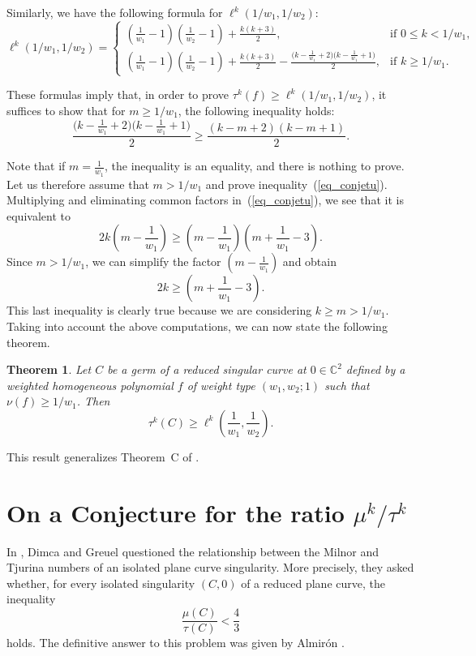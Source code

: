 \documentclass[12pt,letterpaper]{amsart}
\newcommand{\C}{\mathbb{C}}
\newtheorem{theorem}{Theorem}[section]
\begin{document}
Similarly, we have the following formula for $\ell^{k}(1/w_1,1/w_2)$:
\[
\ell^{k}(1/w_1,1/w_2)=
\begin{cases}
\left(\frac{1}{w_1}-1\right)\left(\frac{1}{w_2}-1\right)+\frac{k(k+3)}{2}, & \text{if } 0\leq k< 1/w_1, \\[4pt]
\left(\frac{1}{w_1}-1\right)\left(\frac{1}{w_2}-1\right)+\frac{k(k+3)}{2}-\frac{\big(k-\frac{1}{w_1}+2\big)\big(k-\frac{1}{w_1}+1\big)}{2}, & \text{if } k\geq 1/w_1.
\end{cases}
\]

These formulas imply that, in order to prove $\tau^k(f)\geq \ell^{k}(1/w_1,1/w_2)$, it suffices to show that for $m\geq 1/w_1$, the following inequality holds:
\begin{equation}\label{eq_conjetu}
    \frac{\big(k-\frac{1}{w_1}+2\big)\big(k-\frac{1}{w_1}+1\big)}{2}\geq \frac{(k-m+2)(k-m+1)}{2}.
\end{equation}

Note that if $m=\frac{1}{w_1}$, the inequality is an equality, and there is nothing to prove.  
Let us therefore assume that $m>1/w_1$ and prove inequality~(\ref{eq_conjetu}).  
Multiplying and eliminating common factors in~(\ref{eq_conjetu}), we see that it is equivalent to
\[
2k\left(m-\frac{1}{w_1}\right)\geq \left(m-\frac{1}{w_1}\right)\left(m+\frac{1}{w_1}-3\right).
\]
Since $m>1/w_1$, we can simplify the factor $\left(m-\frac{1}{w_1}\right)$ and obtain
\[
2k\geq \left(m+\frac{1}{w_1}-3\right).
\]
This last inequality is clearly true because we are considering $k\geq m>1/w_1$.  
Taking into account the above computations, we can now state the following theorem.

\begin{theorem}
Let $C$ be a germ of a reduced singular curve at $0\in\C^2$ defined by a weighted homogeneous polynomial $f$ of weight type $(w_1,w_2;1)$ such that $\nu(f)\geq 1/w_1$. Then
\[
\tau^{k}(C)\geq \ell^k\left(\frac{1}{w_1},\frac{1}{w_2}\right).
\]
\end{theorem}

This result generalizes Theorem~C of \cite{k-Milnor}.


\section{On a Conjecture for the ratio $\mu^{k}/\tau^k$}\label{Conjecture}

In \cite{Dimca-Greuel}, Dimca and Greuel questioned the relationship between the Milnor and Tjurina numbers of an isolated plane curve singularity. More precisely, they asked whether, for every isolated singularity $(C,0)$ of a reduced plane curve, the inequality
\[
\frac{\mu(C)}{\tau(C)} < \frac{4}{3}
\]
holds. The definitive answer to this problem was given by Almir\'on \cite{Almiron}. 
\end{document}
